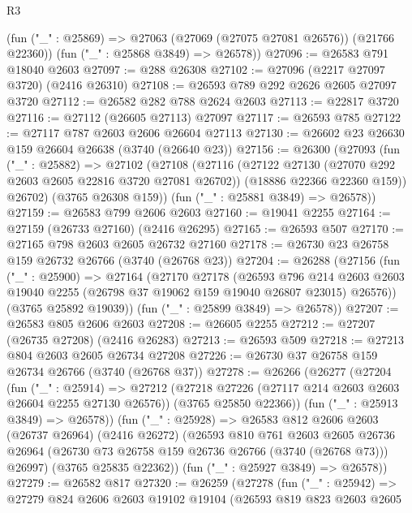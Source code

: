 \begin{lexlean}{R3}
\begin{coremodule}
      (fun ("_" : @25869) => @27063 (@27069 (@27075 @27081 @26576)) (@21766 @22360))
      (fun ("_" : @25868 @3849) => @26578))
@27096 := @26583 @791 @18040 @2603
@27097 := @288 @26308
@27102 := @27096 (@2217 @27097 @3720) (@2416 @26310)
@27108 := @26593 @789 @292 @2626 @2605 @27097 @3720
@27112 := @26582 @282 @788 @2624 @2603
@27113 := @22817 @3720
@27116 := @27112 (@26605 @27113) @27097
@27117 := @26593 @785
@27122 := @27117 @787 @2603 @2606 @26604 @27113
@27130 := @26602 @23 @26630 @159 @26604 @26638 (@3740 (@26640 @23))
@27156 := @26300
    (@27093
      (fun ("_" : @25882) =>
      @27102
        (@27108
          (@27116
            (@27122 @27130 (@27070 @292 @2603 @2605 @22816 @3720 @27081 @26702))
            (@18886 @22366 @22360 @159))
          @26702)
        (@3765 @26308 @159))
      (fun ("_" : @25881 @3849) => @26578))
@27159 := @26583 @799 @2606 @2603
@27160 := @19041 @2255
@27164 := @27159 (@26733 @27160) (@2416 @26295)
@27165 := @26593 @507
@27170 := @27165 @798 @2603 @2605 @26732 @27160
@27178 := @26730 @23 @26758 @159 @26732 @26766 (@3740 (@26768 @23))
@27204 := @26288
    (@27156
      (fun ("_" : @25900) =>
      @27164
        (@27170
          @27178
          (@26593
            @796
            @214
            @2603
            @2603
            @19040
            @2255
            (@26798 @37 @19062 @159 @19040 @26807 @23015)
            @26576))
        (@3765 @25892 @19039))
      (fun ("_" : @25899 @3849) => @26578))
@27207 := @26583 @805 @2606 @2603
@27208 := @26605 @2255
@27212 := @27207 (@26735 @27208) (@2416 @26283)
@27213 := @26593 @509
@27218 := @27213 @804 @2603 @2605 @26734 @27208
@27226 := @26730 @37 @26758 @159 @26734 @26766 (@3740 (@26768 @37))
@27278 := @26266
    (@26277
      (@27204
        (fun ("_" : @25914) =>
        @27212
          (@27218 @27226 (@27117 @214 @2603 @2603 @26604 @2255 @27130 @26576))
          (@3765 @25850 @22366))
        (fun ("_" : @25913 @3849) => @26578))
      (fun ("_" : @25928) =>
      @26583
        @812
        @2606
        @2603
        (@26737 @26964)
        (@2416 @26272)
        (@26593
          @810
          @761
          @2603
          @2605
          @26736
          @26964
          (@26730 @73 @26758 @159 @26736 @26766 (@3740 (@26768 @73)))
          @26997)
        (@3765 @25835 @22362))
      (fun ("_" : @25927 @3849) => @26578))
@27279 := @26582 @817
@27320 := @26259
    (@27278
      (fun ("_" : @25942) =>
      @27279
        @824
        @2606
        @2603
        @19102
        @19104
        (@26593
          @819
          @823
          @2603
          @2605

\end{coremodule}
\end{lexlean}
